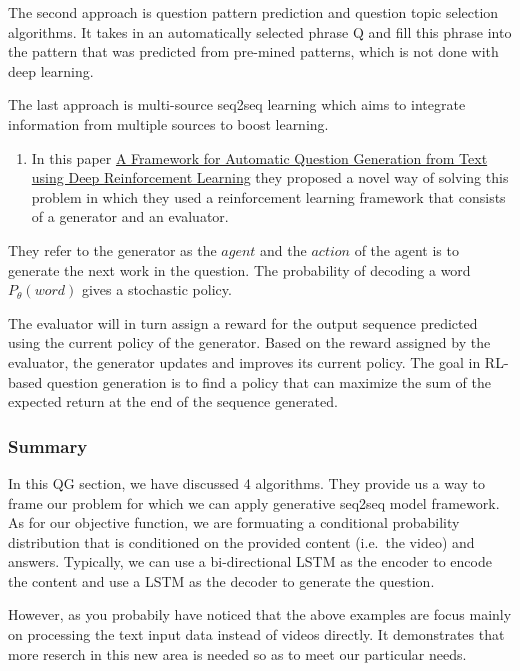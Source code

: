\documentclass[]{book}
\providecommand{\tightlist}{%
  \setlength{\itemsep}{0pt}\setlength{\parskip}{0pt}}
\theoremstyle{definition}
\theoremstyle{definition}
\theoremstyle{definition}
\theoremstyle{remark}
\begin{document}
The second approach is question pattern prediction and question topic
selection algorithms. It takes in an automatically selected phrase Q and
fill this phrase into the pattern that was predicted from pre-mined
patterns, which is not done with deep learning.

The last approach is multi-source seq2seq learning which aims to
integrate information from multiple sources to boost learning.

\begin{enumerate}
\def\labelenumi{\arabic{enumi}.}
\setcounter{enumi}{3}
\tightlist
\item
  In this paper \href{https://arxiv.org/pdf/1808.04961.pdf}{A Framework
  for Automatic Question Generation from Text using Deep Reinforcement
  Learning} they proposed a novel way of solving this problem in which
  they used a reinforcement learning framework that consists of a
  generator and an evaluator.
\end{enumerate}

They refer to the generator as the \(agent\) and the \(action\) of the
agent is to generate the next work in the question. The probability of
decoding a word \(P_{\theta}(word)\) gives a stochastic policy.

The evaluator will in turn assign a reward for the output sequence
predicted using the current policy of the generator. Based on the reward
assigned by the evaluator, the generator updates and improves its
current policy. The goal in RL-based question generation is to find a
policy that can maximize the sum of the expected return at the end of
the sequence generated.

\subsubsection{Summary}\label{summary}

In this QG section, we have discussed 4 algorithms. They provide us a
way to frame our problem for which we can apply generative seq2seq model
framework. As for our objective function, we are formuating a
conditional probability distribution that is conditioned on the provided
content (i.e.~the video) and answers. Typically, we can use a
bi-directional LSTM as the encoder to encode the content and use a LSTM
as the decoder to generate the question.

However, as you probabily have noticed that the above examples are focus
mainly on processing the text input data instead of videos directly. It
demonstrates that more reserch in this new area is needed so as to meet
our particular needs.
\end{document}
